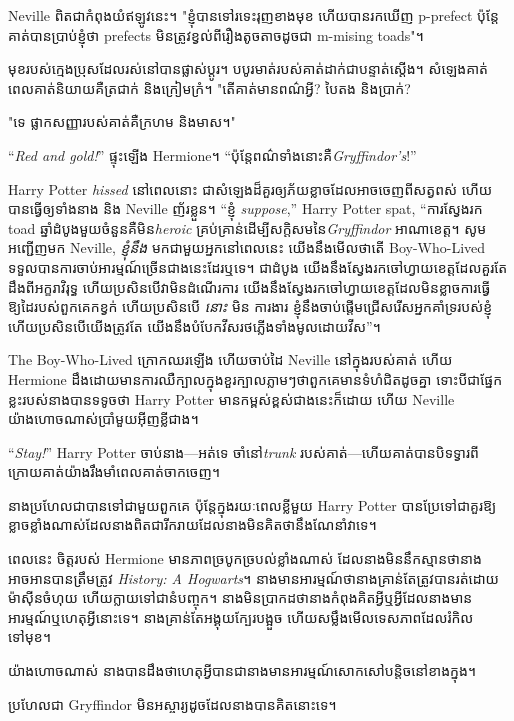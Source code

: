 Neville \emph{} ពិតជាកំពុងយំឥឡូវនេះ។ "ខ្ញុំបានទៅរទេះរុញខាងមុខ ហើយបានរកឃើញ p-prefect ប៉ុន្តែគាត់បានប្រាប់ខ្ញុំថា prefects មិនត្រូវខ្វល់ពីរឿងតូចតាចដូចជា m-mising toads"។

មុខរបស់ក្មេងប្រុសដែលរស់នៅបានផ្លាស់ប្តូរ។ បបូរមាត់របស់គាត់ដាក់ជាបន្ទាត់ស្តើង។ សំឡេង​គាត់​ពេល​គាត់​និយាយ​គឺ​ត្រជាក់ និង​ក្រៀមក្រំ។ "តើគាត់មានពណ៌អ្វី? បៃតង និងប្រាក់?

"ទេ ផ្លាកសញ្ញារបស់គាត់គឺក្រហម និងមាស។"

“\emph{Red and gold!}” ផ្ទុះឡើង Hermione។ “ប៉ុន្តែពណ៌ទាំងនោះគឺ\emph{Gryffindor's}!”

Harry Potter \emph{hissed} នៅ​ពេល​នោះ ជា​សំឡេង​ដ៏​គួរ​ឲ្យ​ភ័យ​ខ្លាច​ដែល​អាច​ចេញ​ពី​សត្វ​ពស់ ហើយ​បាន​ធ្វើ​ឲ្យ​ទាំង​នាង និង Neville ញ័រ​ខ្លួន។ “ខ្ញុំ \emph{suppose},” Harry Potter spat, “ការស្វែងរក toad ឆ្នាំដំបូងមួយចំនួនគឺមិន\emph{heroic} គ្រប់គ្រាន់ដើម្បីសក្ដិសមនៃ\emph{Gryffindor} អាណាខេត្ត។ សូមអញ្ជើញមក Neville, \emph{ខ្ញុំនឹង} មកជាមួយអ្នកនៅពេលនេះ យើងនឹងមើលថាតើ Boy-Who-Lived ទទួលបានការចាប់អារម្មណ៍ច្រើនជាងនេះដែរឬទេ។ ជាដំបូង យើងនឹងស្វែងរកចៅហ្វាយខេត្តដែលគួរតែដឹងពីអក្ខរាវិរុទ្ធ ហើយប្រសិនបើវាមិនដំណើរការ យើងនឹងស្វែងរកចៅហ្វាយខេត្តដែលមិនខ្លាចការធ្វើឱ្យដៃរបស់ពួកគេកខ្វក់ ហើយប្រសិនបើ \emph{នោះ} មិន ការងារ ខ្ញុំនឹងចាប់ផ្តើមជ្រើសរើសអ្នកគាំទ្ររបស់ខ្ញុំ ហើយប្រសិនបើយើងត្រូវតែ យើងនឹងបំបែកវីសរថភ្លើងទាំងមូលដោយវីស”។

The Boy-Who-Lived ក្រោកឈរឡើង ហើយចាប់ដៃ Neville នៅក្នុងរបស់គាត់ ហើយ Hermione ដឹងដោយមានការឈឺក្បាលក្នុងខួរក្បាលភ្លាមៗថាពួកគេមានទំហំជិតដូចគ្នា ទោះបីជាផ្នែកខ្លះរបស់នាងបានទទូចថា Harry Potter មានកម្ពស់ខ្ពស់ជាងនេះក៏ដោយ ហើយ Neville យ៉ាងហោចណាស់ប្រាំមួយអ៊ីញខ្លីជាង។

“\emph{Stay!}” Harry Potter ចាប់នាង—អត់ទេ ចាំនៅ\emph{trunk} របស់គាត់—ហើយគាត់បានបិទទ្វារពីក្រោយគាត់យ៉ាងរឹងមាំពេលគាត់ចាកចេញ។

នាងប្រហែលជាបានទៅជាមួយពួកគេ ប៉ុន្តែក្នុងរយៈពេលខ្លីមួយ Harry Potter បានប្រែទៅជាគួរឱ្យខ្លាចខ្លាំងណាស់ដែលនាងពិតជារីករាយដែលនាងមិនគិតថានឹងណែនាំវាទេ។

ពេលនេះ ចិត្តរបស់ Hermione មានភាពច្របូកច្របល់ខ្លាំងណាស់ ដែលនាងមិននឹកស្មានថានាងអាចអានបានត្រឹមត្រូវ \emph{History: A Hogwarts}។ នាង​មាន​អារម្មណ៍​ថា​នាង​គ្រាន់​តែ​ត្រូវ​បាន​រត់​ដោយ​ម៉ាស៊ីន​ចំហុយ ហើយ​ក្លាយ​ទៅ​ជា​នំ​បញ្ចុក។ នាង​មិន​ប្រាកដ​ថា​នាង​កំពុង​គិត​អ្វី​ឬ​អ្វី​ដែល​នាង​មាន​អារម្មណ៍​ឬ​ហេតុ​អ្វី​នោះ​ទេ​។ នាងគ្រាន់តែអង្គុយក្បែរបង្អួច ហើយសម្លឹងមើលទេសភាពដែលរំកិលទៅមុខ។

យ៉ាង​ហោច​ណាស់ នាង​បាន​ដឹង​ថា​ហេតុ​អ្វី​បាន​ជា​នាង​មាន​អារម្មណ៍​សោកសៅ​បន្តិច​នៅ​ខាង​ក្នុង។

ប្រហែលជា Gryffindor មិនអស្ចារ្យដូចដែលនាងបានគិតនោះទេ។

